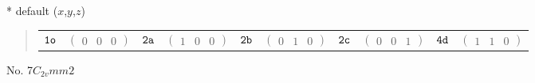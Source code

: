 \documentclass[fleqn,9pt,landscape]{jsarticle}
\begin{document}
* default ($x$,$y$,$z$)
\begin{quote}
\begin{tabular}{cccccccccc}
$ {\tt 1o} $ & $ \begin{pmatrix} 0 & 0 & 0 \end{pmatrix} $ & $ {\tt 2a} $ & $ \begin{pmatrix} 1 & 0 & 0 \end{pmatrix} $ & $ {\tt 2b} $ & $ \begin{pmatrix} 0 & 1 & 0 \end{pmatrix} $ & $ {\tt 2c} $ & $ \begin{pmatrix} 0 & 0 & 1 \end{pmatrix} $ & $ {\tt 4d} $ & $ \begin{pmatrix} 1 & 1 & 0 \end{pmatrix} $
\end{tabular}
\end{quote}
\newpage
No. 7\quad$C_{2v}$\quad$mm2$\quad[ orthorhombic ]
\end{document}
